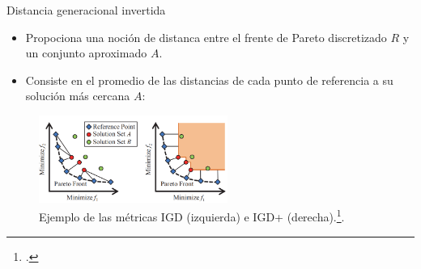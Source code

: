 \documentclass{beamer}
\begin{document}
\begin{frame}{Distancia generacional invertida}
\begin{itemize}
\justifying
\scriptsize
\item Propociona una noción de distanca entre el frente de Pareto discretizado $R$ y un conjunto aproximado $A$.
\item Consiste en el promedio de las distancias de cada punto de referencia a su solución más cercana $A$:
\end{itemize}
\begin{table}[]
\end{table}
\begin{figure}[H]
\centering
\includegraphics[width=0.55\textwidth]{igd.png}
\caption{\scriptsize Ejemplo de las métricas IGD (izquierda) e IGD+ (derecha).\footcite{ishibuchi2016sensitivity}.}
\end{figure}
\end{frame}
\end{document}
